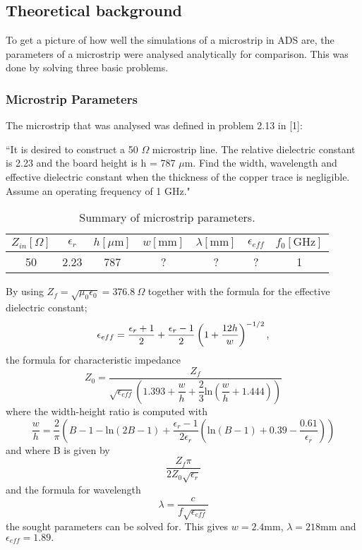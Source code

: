 \documentclass[report.tex]{subfiles}
\begin{document}
\subsection{Theoretical background}\label{sec: Lab1 Theoretical Background}
To get a picture of how well the simulations of a microstrip in ADS are, the parameters of a microstrip  were analysed analytically for comparison. This was done by solving three basic problems.

\subsubsection{Microstrip Parameters}\label{subsubsec: Microstrip_Parameters}
The microstrip that was analysed was defined in problem 2.13 in [1]:

``It is desired to construct a 50 $\Omega$ microstrip line. The relative dielectric constant is 2.23 and the board height is h = 787 $\mu \text{m.}$ Find the width, wavelength and effective dielectric constant when the thickness of the copper trace is negligible. Assume an operating frequency of 1 GHz."

\begin{table}[h]
    \centering
    \caption{Summary of microstrip parameters.}
    \begin{tabular}{c | c | c | c | c | c | c}
        $Z_{in} [\Omega]$ & $\epsilon_r $ & $h [\mu \text{m}]$ & $w [\text{mm}]$ & $\lambda [\text{mm}]$ & $\epsilon_{eff}$ & $f_0 [\text{GHz}]$\\
        \hline
         50 & 2.23 & 787 & ? & ? & ? & 1
    \end{tabular}
    \label{table: Lab1 Microstrip parameters}
\end{table}

By using $Z_{f} = \sqrt{\mu_{0} \epsilon_{0}} = 376.8\:\Omega$ together with the formula for the effective dielectric constant;
\begin{equation}
	\epsilon_{eff} = \dfrac{\epsilon_{r} + 1}{2} + \dfrac{\epsilon_{r} - 1}{2} \left(1 + {\dfrac{12 h}{w}} \right)^{-1/2} \text ,
\end{equation}
the formula for characteristic impedance
\begin{equation}
	Z_0 = \dfrac{Z_f}{\sqrt{\epsilon_{eff}}\left(1.393 + \dfrac{w}{h} + \dfrac{2}{3} \text{ln}\left(\dfrac{w}{h} + 1.444 \right)\right)}
\end{equation}
where the width-height ratio is computed with
\begin{equation}
	\dfrac{w}{h} = \dfrac{2}{\pi}\left(B - 1 - \text{ln}\left(2B - 1 \right) + \dfrac{\epsilon_r - 1}{2 \epsilon_r}\left(\text{ln}\left(B -1\right) + 0.39 - \dfrac{0.61}{\epsilon_r}\right)\right)
\end{equation}
and where B is given by
\begin{equation}
\dfrac{Z_f \pi}{2Z_0\sqrt{\epsilon_r}}
\end{equation}
and the formula for wavelength
\begin{equation}
	\lambda = \dfrac{c}{f\sqrt{\epsilon_{eff}}}
\end{equation}
the sought parameters can be solved for. This gives $w = 2.4 \text{mm}$, $\lambda = 218 \text{mm}$ and $\epsilon_{eff} = 1.89 \text{.}$
\end{document}
